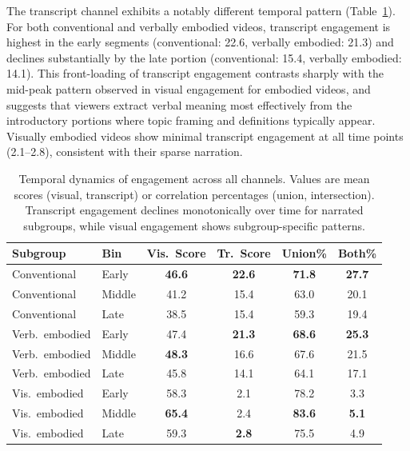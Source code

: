 \documentclass[fleqn,10pt]{wlscirep}
\begin{document}
The transcript channel exhibits a notably different temporal pattern (Table~\ref{tab:temporal_all}). For both conventional and verbally embodied videos, transcript engagement is highest in the early segments (conventional: 22.6, verbally embodied: 21.3) and declines substantially by the late portion (conventional: 15.4, verbally embodied: 14.1). This front-loading of transcript engagement contrasts sharply with the mid-peak pattern observed in visual engagement for embodied videos, and suggests that viewers extract verbal meaning most effectively from the introductory portions where topic framing and definitions typically appear. Visually embodied videos show minimal transcript engagement at all time points (2.1--2.8), consistent with their sparse narration.

\begin{table}[ht]
    \centering
    \caption{Temporal dynamics of engagement across all channels. Values are mean scores (visual, transcript) or correlation percentages (union, intersection). Transcript engagement declines monotonically over time for narrated subgroups, while visual engagement shows subgroup-specific patterns.}
    \label{tab:temporal_all}
    \begin{tabular}{llcccc}
        \toprule
        Subgroup & Bin & Vis.\ Score & Tr.\ Score & Union\% & Both\% \\
        \midrule
        Conventional & Early & \textbf{46.6} & \textbf{22.6} & \textbf{71.8} & \textbf{27.7} \\
        Conventional & Middle & 41.2 & 15.4 & 63.0 & 20.1 \\
        Conventional & Late & 38.5 & 15.4 & 59.3 & 19.4 \\
        \addlinespace
        Verb.\ embodied & Early & 47.4 & \textbf{21.3} & \textbf{68.6} & \textbf{25.3} \\
        Verb.\ embodied & Middle & \textbf{48.3} & 16.6 & 67.6 & 21.5 \\
        Verb.\ embodied & Late & 45.8 & 14.1 & 64.1 & 17.1 \\
        \addlinespace
        Vis.\ embodied & Early & 58.3 & 2.1 & 78.2 & 3.3 \\
        Vis.\ embodied & Middle & \textbf{65.4} & 2.4 & \textbf{83.6} & \textbf{5.1} \\
        Vis.\ embodied & Late & 59.3 & \textbf{2.8} & 75.5 & 4.9 \\
        \bottomrule
    \end{tabular}
\end{table}
\end{document}
